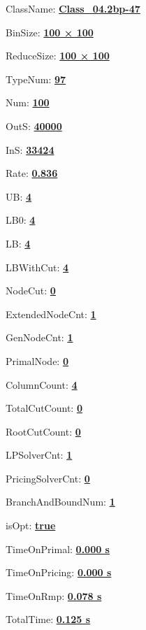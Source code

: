 \documentclass[11pt]{article}
\begin{document}
\pagestyle{empty}


ClassName: \underline{\textbf{Class_04.2bp-47}}
\par
BinSize: \underline{\textbf{100 × 100}}
\par
ReduceSize: \underline{\textbf{100 × 100}}
\par
TypeNum: \underline{\textbf{97}}
\par
Num: \underline{\textbf{100}}
\par
OutS: \underline{\textbf{40000}}
\par
InS: \underline{\textbf{33424}}
\par
Rate: \underline{\textbf{0.836}}
\par
UB: \underline{\textbf{4}}
\par
LB0: \underline{\textbf{4}}
\par
LB: \underline{\textbf{4}}
\par
LBWithCut: \underline{\textbf{4}}
\par
NodeCut: \underline{\textbf{0}}
\par
ExtendedNodeCnt: \underline{\textbf{1}}
\par
GenNodeCnt: \underline{\textbf{1}}
\par
PrimalNode: \underline{\textbf{0}}
\par
ColumnCount: \underline{\textbf{4}}
\par
TotalCutCount: \underline{\textbf{0}}
\par
RootCutCount: \underline{\textbf{0}}
\par
LPSolverCnt: \underline{\textbf{1}}
\par
PricingSolverCnt: \underline{\textbf{0}}
\par
BranchAndBoundNum: \underline{\textbf{1}}
\par
isOpt: \underline{\textbf{true}}
\par
TimeOnPrimal: \underline{\textbf{0.000 s}}
\par
TimeOnPricing: \underline{\textbf{0.000 s}}
\par
TimeOnRmp: \underline{\textbf{0.078 s}}
\par
TotalTime: \underline{\textbf{0.125 s}}
\par
\newpage
\end{document}

